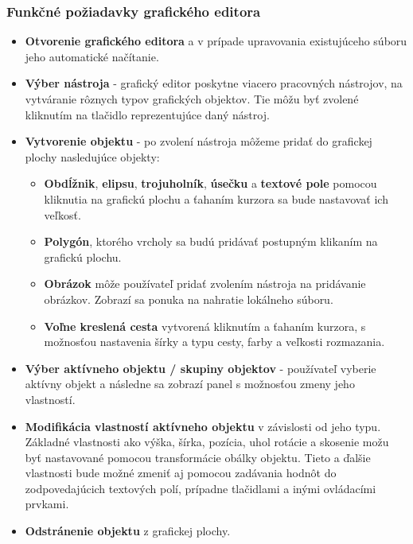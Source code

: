 \subsubsection{Funkčné požiadavky grafického editora}
\begin{itemize}
	\item \textbf{Otvorenie grafického editora} a v prípade upravovania existujúceho súboru jeho automatické načítanie.
	
	\item \textbf{Výber nástroja} - grafický editor poskytne viacero pracovných nástrojov, na vytváranie rôznych typov grafických objektov. Tie môžu byť zvolené kliknutím na tlačidlo reprezentujúce daný nástroj. 
	
	\item \textbf{Vytvorenie objektu} - po zvolení nástroja môžeme pridať do grafickej plochy nasledujúce objekty:
	\begin{itemize}
		\item \textbf{Obdĺžnik}, \textbf{elipsu}, \textbf{trojuholník}, \textbf{úsečku} a \textbf{textové pole} pomocou kliknutia na grafickú plochu a  ťahaním kurzora sa bude nastavovať ich veľkosť.
		\item \textbf{Polygón}, ktorého vrcholy sa budú pridávať postupným klikaním na grafickú plochu.
		\item \textbf{Obrázok} môže používateľ pridať zvolením nástroja na pridávanie obrázkov. Zobrazí sa ponuka na nahratie lokálneho súboru.
		\item \textbf{Voľne kreslená cesta} vytvorená kliknutím a ťahaním kurzora, s možnosťou nastavenia šírky a typu cesty, farby a veľkosti rozmazania.
	\end{itemize}
	
	\item \textbf{Výber aktívneho objektu / skupiny objektov} - používateľ vyberie aktívny objekt a následne sa zobrazí panel s možnosťou zmeny jeho vlastností.
	
	\item \textbf{Modifikácia vlastností aktívneho objektu} v závislosti od jeho typu. Základné vlastnosti ako výška, šírka, pozícia, uhol rotácie a skosenie možu byť nastavované pomocou transformácie obálky objektu. Tieto a ďalšie vlastnosti bude možné zmeniť aj pomocou zadávania hodnôt do zodpovedajúcich textových polí, prípadne tlačidlami a inými ovládacími prvkami.
	
	\item \textbf{Odstránenie objektu} z grafickej plochy. 
	

\end{itemize}
